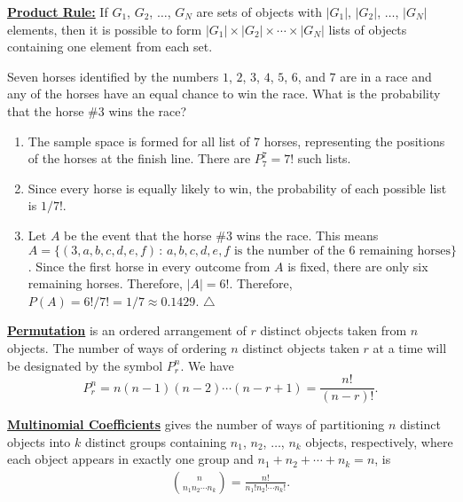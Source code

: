 \underline{\textbf{Product Rule:}} If $G_1$, $G_2$, $\ldots$, $G_N$ are sets of objects with $|G_1|$, $|G_2|$, $\ldots$, $|G_N|$ elements, then it is possible to form $|G_1| \times |G_2| \times \cdots \times |G_N|$ lists of objects containing one element from each set.

\vspace*{10pt}

\begin{example}
Seven horses identified by the numbers $1$, $2$, $3$, $4$, $5$, $6$, and $7$ are in a race and any of the horses have an equal chance to win the race. What is the probability that the horse \#3 wins the race?
\end{example}

\begin{sol*}
\begin{enumerate}[label=\Circled{\arabic*}]
\item The sample space is formed for all list of $7$ horses, representing the positions of the horses at the finish line. There are $P_7^7 = 7!$ such lists.
\item Since every horse is equally likely to win, the probability of each possible list is $1 / 7!$.
\item Let $A$ be the event that the horse \#3 wins the race. This means $A = \{ (3, a, b, c, d, e, f) \, : \, a, b, c, d, e, f \text{ is the number of the 6 remaining horses} \}$. Since the first horse in every outcome from $A$ is fixed, there are only six remaining horses. Therefore, $|A| = 6!$. Therefore, $P (A) = 6! / 7! = 1/7 \approx 0.1429$. \hfill $\triangle$
\end{enumerate}
\end{sol*}

\underline{\textbf{Permutation}} is an ordered arrangement of $r$ distinct objects taken from $n$ objects. The number of ways of ordering $n$ distinct objects taken $r$ at a time will be designated by the symbol $P_r^n$. We have
	$$
	P_r^n = n (n - 1) (n - 2) \cdots (n - r + 1) = \frac{n!}{(n - r)!}.
	$$

\underline{\textbf{Multinomial Coefficients}} gives the number of ways of partitioning $n$ distinct objects into $k$ distinct groups containing $n_1$, $n_2$, $\ldots$, $n_k$ objects, respectively, where each object appears in exactly one group and $n_1 + n_2 + \cdots + n_k = n$, is
	\begin{align*}
	\binom{n}{n_1 n_2 \cdots n_k} = \frac{n!}{n_1! n_2! \cdots n_k!} .
	\end{align*}
	
